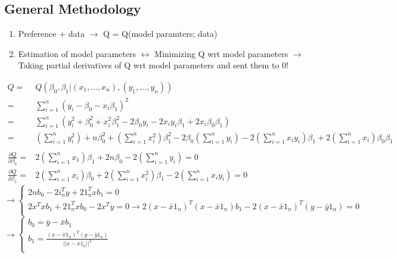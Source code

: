 \documentclass[11pt]{article}
\theoremstyle{definition}
\begin{document}
\subsection*{General Methodology}
\begin{enumerate}
\item Preference $+$ data $\rightarrow$ Q = Q(model paramters; data)
\item Estimation of model parameters $\leftrightarrow$ Minimizing Q wrt model parameters $\rightarrow$ Taking partial derivatives of Q wrt model parameters and sent them to 0!
\end{enumerate}

\begin{align*}
Q =& Q(\beta_0, \beta_1 | (x_1, \dots, x_n), (y_1, \dots, y_n))\\
=& \sum_{i = 1}^n (y_i - \beta_0 - x_i\beta_1)^2\\
=& \sum_{i = 1}^n (y_i^2 + \beta_0^2 + x_i^2\beta_1^2 - 2\beta_0y_i - 2x_iy_i\beta_1 + 2x_i\beta_0\beta_1)\\
=& (\sum_{i = 1}^n y_i^2) + n\beta_0^2 + (\sum_{i = 1}^n x_i^2)\beta_1^2 - 2\beta_0(\sum_{i = 1}^n y_i) - 2(\sum_{i = 1}^n x_iy_i)\beta_1 + 2(\sum_{i = 1}^n x_i)\beta_0\beta_1\\\\
\frac{\partial Q}{\partial \beta_0} =& 2(\sum_{i = 1}^n x_1)\beta_1 + 2n\beta_0 - 2(\sum_{i = 1}^ny_i) = 0\\
\frac{\partial Q}{\partial \beta_1} =& 2(\sum_{i = 1}^n x_i)\beta_0 + 2(\sum_{i = 1}^n x_i^2)\beta_1 - 2(\sum_{i = 1}^n x_iy_i) = 0
\end{align*}
$\rightarrow
\begin{cases}
2nb_0 - 2i_n^Ty + 21_n^Txb_1 = 0\\
2x^Txb_1 + 21_n^Txb_0 - 2x^Ty = 0 \rightarrow 2(x - \bar{x}1_n)^T(x - \bar{x}1_n)b_1 - 2(x - \bar{x}1_n)^T(y - \bar{y}1_n) = 0\\
\end{cases}
$\\
$\rightarrow
\begin{cases}
b_0 = \bar{y} - \bar{x}b_1\\
b_1 = \frac{(x - \bar{x}1_n)^T(y - \bar{y}1_n)}{||x - \bar{x}1_n||^2}\\
\end{cases}
$\\
\end{document}
